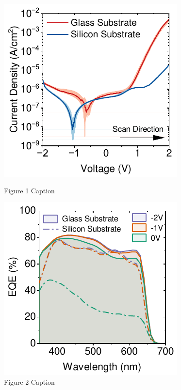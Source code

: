 \begin{figure}[h!]
    \centering
    \begin{minipage}{0.48\textwidth}
        \centering
        \includegraphics[width=\textwidth]{chapters/material_properties/images/JV_PIX_Glass.pdf} %
        \caption{Figure 1 Caption}
        \label{fig:ch2:jv_comp_pic_glass}
    \end{minipage}
    \hfill
    \begin{minipage}{0.48\textwidth}
        \centering
        \includegraphics[width=\textwidth]{chapters/material_properties/images/EQE_fnm_PIX_Glass.pdf} %
        \caption{Figure 2 Caption}
        \label{fig:ch2:eqe_comp_pix_glass}
    \end{minipage}


\end{figure}
